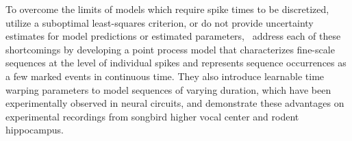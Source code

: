 \documentclass[brainsci, %
               review,submit,pdftex,moreauthors
               ]{Definitions/mdpi}
\begin{document}

To overcome the limits of models which require spike times to be discretized, utilize a suboptimal least-squares criterion, or do not provide uncertainty estimates for model predictions or estimated parameters,~\citep{williams_point_2020} address each of these shortcomings by developing a point process model that characterizes fine-scale sequences at the level of individual spikes and represents sequence occurrences as a few marked events in continuous time. They also introduce learnable time warping parameters to model sequences of varying duration, which have been experimentally observed in neural circuits, and demonstrate these advantages on experimental recordings from songbird higher vocal center and rodent hippocampus.

\end{document}
